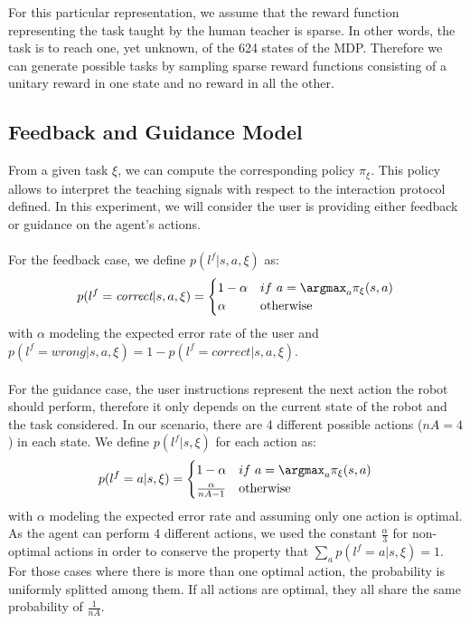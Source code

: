 For this particular representation, we assume that the reward function representing the task taught by the human teacher is sparse. In other words, the task is to reach one, yet unknown, of the 624 states of the MDP. Therefore we can generate possible tasks by sampling sparse reward functions consisting of a unitary reward in one state and no reward in all the other.

\subsection{Feedback and Guidance Model}
\label{chapter:lfui:framemodels}

From a given task $\xi$, we can compute the corresponding policy $\pi_{\xi}$. This policy allows to interpret the teaching signals with respect to the interaction protocol defined. In this experiment, we will consider the user is providing either feedback or guidance on the agent's actions. 

\paragraph{} For the feedback case, we define $p(l^f |s,a,\xi)$ as:
%
\begin{equation}
    p(l^f = \emph{correct} |s,a,\xi) = 
    \begin{cases}
    1-\alpha               & if~a = \argmax_a \pi_{\xi}(s,a)\\
        \alpha             & \text{otherwise}\\
   \end{cases}
   \label{eq:feedbackframe}
\end{equation}
%
with $\alpha$ modeling the expected error rate of the user and $p(l^f = wrong |s,a,\xi) = 1 - p(l^f = correct |s,a,\xi)$.

\paragraph{} For the guidance case, the user instructions represent the next action the robot should perform, therefore it only depends on the current state of the robot and the task considered. In our scenario, there are 4 different possible actions ($nA = 4$) in each state. We define $p(l^f |s, \xi)$ for each action as:
%
\begin{equation}
    p(l^f = a |s,\xi) = 
    \begin{cases}
        1-\alpha & if~a = \argmax_a \pi_{\xi}(s,a)\\
        \frac{\alpha}{nA-1} & \text{otherwise}\\
   \end{cases}
   \label{eq:guidanceframe}
\end{equation}
%
with $\alpha$ modeling the expected error rate and assuming only one action is optimal. As the agent can perform 4 different actions, we used the constant $\frac{\alpha}{3}$ for non-optimal actions in order to conserve the property that $\sum_a p(l^f = a |s,\xi) = 1$. For those cases where there is more than one optimal action, the probability is uniformly splitted among them. If all actions are optimal, they all share the same probability of $\frac{1}{nA}$.

